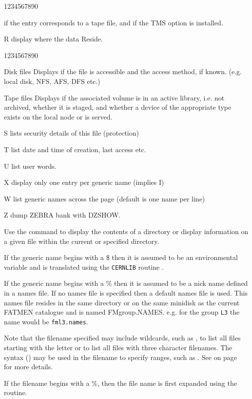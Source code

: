 \begin{DLtt}{1234567890}
\begin{DLtt}{12}
if the entry corresponds to a tape file, and if the TMS
option is installed.
\item[R]display where the data Reside. 
\begin{DLtt}{1234567890}
\item[Disk files]Displays if the file is accessible and the access method, if
known. (e.g. local disk, NFS, AFS, DFS etc.)
\item[Tape files]Displays if the associated volume is in an active library,
i.e. not archived, whether it is staged, and whether a device of the appropriate
type exists on the local node or is served.
\end{DLtt}
\item[S]lists security details of this file (protection)
\item[T]list date and time of creation, last access etc.
\item[U]list user words.
\item[X]display only one entry per generic name (implies I)
\item[W]list generic names across the page (default is one name per line)
\item[Z]dump ZEBRA bank with DZSHOW.
\end{DLtt}
\end{DLtt}
Use the  command to display the contents of a directory
or display information on a given file within the current or specified
directory.

If the generic name begins with a \$ then it is assumed to be
an environmental variable and is translated using the {\tt CERNLIB}
routine . 

If the generic name begins with a \% then it is assumed to be 
a nick name defined in a names file. If no names file is specified
then a default names file is used. This names file resides in
the same directory or on the same minidisk as the current
FATMEN catalogue and is named FMgroup.NAMES. e.g. for the
group {\tt L3} the name would be {\tt fml3.names}.

Note that the filename specified may include wildcards, such as
,
to list all files starting with the letter
 or 
to list all files with three character filenames.
The syntax () may be used in the filename to specify ranges,
such as . See on page~\pageref{FMATCH} for more details.

If the filename begins with a \%, then the file name is first expanded
using the  routine. 

